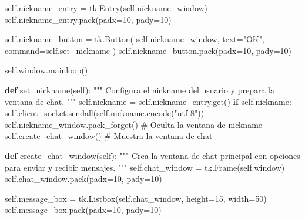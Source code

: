\documentclass[
  a4paper,
  DIV=11,
  numbers=noendperiod,
  onepage,
  openany]{scrreprt}
\newenvironment{Shaded}{\begin{snugshade}}{\end{snugshade}}
\newcommand{\CommentTok}[1]{\textcolor[rgb]{0.37,0.37,0.37}{#1}}
\newcommand{\ControlFlowTok}[1]{\textcolor[rgb]{0.00,0.23,0.31}{\textbf{#1}}}
\newcommand{\DecValTok}[1]{\textcolor[rgb]{0.68,0.00,0.00}{#1}}
\newcommand{\KeywordTok}[1]{\textcolor[rgb]{0.00,0.23,0.31}{\textbf{#1}}}
\newcommand{\NormalTok}[1]{\textcolor[rgb]{0.00,0.23,0.31}{#1}}
\newcommand{\OperatorTok}[1]{\textcolor[rgb]{0.37,0.37,0.37}{#1}}
\newcommand{\StringTok}[1]{\textcolor[rgb]{0.13,0.47,0.30}{#1}}
\newcommand{\VariableTok}[1]{\textcolor[rgb]{0.07,0.07,0.07}{#1}}
\begin{document}
\begin{Shaded}
\begin{Highlighting}[]
        \VariableTok{self}\NormalTok{.nickname\_entry }\OperatorTok{=}\NormalTok{ tk.Entry(}\VariableTok{self}\NormalTok{.nickname\_window)}
        \VariableTok{self}\NormalTok{.nickname\_entry.pack(padx}\OperatorTok{=}\DecValTok{10}\NormalTok{, pady}\OperatorTok{=}\DecValTok{10}\NormalTok{)}

        \VariableTok{self}\NormalTok{.nickname\_button }\OperatorTok{=}\NormalTok{ tk.Button(}
            \VariableTok{self}\NormalTok{.nickname\_window, text}\OperatorTok{=}\StringTok{"OK"}\NormalTok{, command}\OperatorTok{=}\VariableTok{self}\NormalTok{.set\_nickname}
\NormalTok{        )}
        \VariableTok{self}\NormalTok{.nickname\_button.pack(padx}\OperatorTok{=}\DecValTok{10}\NormalTok{, pady}\OperatorTok{=}\DecValTok{10}\NormalTok{)}

        \VariableTok{self}\NormalTok{.window.mainloop()}

    \KeywordTok{def}\NormalTok{ set\_nickname(}\VariableTok{self}\NormalTok{):}
        \CommentTok{"""}
\CommentTok{        Configura el nickname del usuario y prepara la ventana de chat.}
\CommentTok{        """}
        \VariableTok{self}\NormalTok{.nickname }\OperatorTok{=} \VariableTok{self}\NormalTok{.nickname\_entry.get()}
        \ControlFlowTok{if} \VariableTok{self}\NormalTok{.nickname:}
            \VariableTok{self}\NormalTok{.client\_socket.sendall(}\VariableTok{self}\NormalTok{.nickname.encode(}\StringTok{"utf{-}8"}\NormalTok{))}
            \VariableTok{self}\NormalTok{.nickname\_window.pack\_forget()  }\CommentTok{\# Oculta la ventana de nickname}
            \VariableTok{self}\NormalTok{.create\_chat\_window()  }\CommentTok{\# Muestra la ventana de chat}

    \KeywordTok{def}\NormalTok{ create\_chat\_window(}\VariableTok{self}\NormalTok{):}
        \CommentTok{"""}
\CommentTok{        Crea la ventana de chat principal con opciones para enviar y recibir mensajes.}
\CommentTok{        """}
        \VariableTok{self}\NormalTok{.chat\_window }\OperatorTok{=}\NormalTok{ tk.Frame(}\VariableTok{self}\NormalTok{.window)}
        \VariableTok{self}\NormalTok{.chat\_window.pack(padx}\OperatorTok{=}\DecValTok{10}\NormalTok{, pady}\OperatorTok{=}\DecValTok{10}\NormalTok{)}

        \VariableTok{self}\NormalTok{.message\_box }\OperatorTok{=}\NormalTok{ tk.Listbox(}\VariableTok{self}\NormalTok{.chat\_window, height}\OperatorTok{=}\DecValTok{15}\NormalTok{, width}\OperatorTok{=}\DecValTok{50}\NormalTok{)}
        \VariableTok{self}\NormalTok{.message\_box.pack(padx}\OperatorTok{=}\DecValTok{10}\NormalTok{, pady}\OperatorTok{=}\DecValTok{10}\NormalTok{)}


\end{Highlighting}
\end{Shaded}
\end{document}
